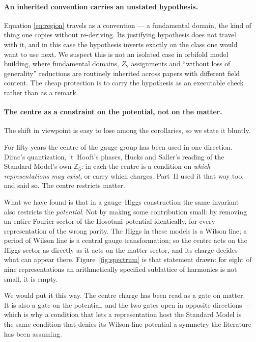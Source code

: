 \documentclass[11pt,a4paper]{article}
\newcommand{\ZZ}{\mathbb{Z}}
\begin{document}
\paragraph{An inherited convention carries an unstated hypothesis.} Equation
\eqref{eq:region} travels as a convention --- a fundamental domain, the kind of thing one
copies without re-deriving. Its justifying hypothesis does not travel with it, and in this
case the hypothesis inverts exactly on the class one would want to use next. We suspect this
is not an isolated case in orbifold model building, where fundamental domains, $Z_2$
assignments and ``without loss of generality'' reductions are routinely inherited across
papers with different field content. The cheap protection is to carry the hypothesis as an
executable check rather than as a remark.

\paragraph{The centre as a constraint on the potential, not on the matter.} The shift in
viewpoint is easy to lose among the corollaries, so we state it bluntly.

For fifty years the centre of the gauge group has been used in one direction. Dirac's
quantization, 't~Hooft's phases, Hucks and Saller's reading of the Standard Model's own
$\ZZ_6$: in each the centre is a condition on \emph{which representations may exist}, or
carry which charges. Part~II used it that way too, and said so. The centre restricts matter.

What we have found is that in a gauge--Higgs construction the same invariant also restricts
the \emph{potential}. Not by making some contribution small: by removing an entire Fourier
sector of the Hosotani potential identically, for every representation of the wrong parity.
The Higgs in these models is a Wilson line; a period of Wilson line is a central gauge
transformation; so the centre acts on the Higgs sector as directly as it acts on the matter
sector, and its charge decides what can appear there. Figure~\ref{fig:spectrum} is that
statement drawn: for eight of nine representations an arithmetically specified sublattice of
harmonics is not small, it is empty.

We would put it this way. The centre charge has been read as a gate on matter. It is also a
gate on the potential, and the two gates open in opposite directions --- which is why a
condition that lets a representation host the Standard Model is the same condition that
denies its Wilson-line potential a symmetry the literature has been assuming.
\end{document}
